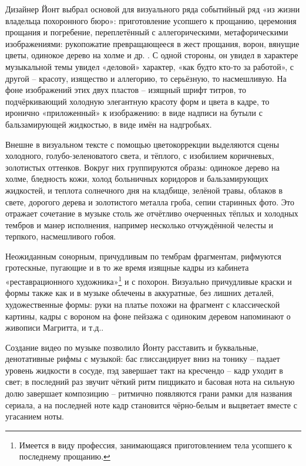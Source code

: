 Дизайнер Йонт выбрал основой для визуального ряда событийный ряд «из жизни владельца похоронного бюро»: приготовление усопшего к прощанию, церемония прощания и погребение, переплетённый с аллегорическими, метафорическими изображениями: рукопожатие превращающееся в жест прощания, ворон, вянущие цветы, одинокое дерево на холме и др. \autocite{yount.SFUTitles.2012}.
С одной стороны, он увидел в характере музыкальной темы увидел «деловой» характер, «как будто кто-то за работой», с другой -- красоту, изящество и аллегорию, то серьёзную, то насмешливую.
На фоне изображений этих двух пластов -- изящный шрифт титров, то подчёркивающий холодную элегантную красоту форм и цвета в кадре, то иронично «приложенный» к изображению: в виде надписи на бутыли с бальзамирующей жидкостью, в виде имён на надгробьях.

Внешне в визуальном тексте с помощью цветокоррекции выделяются сцены холодного, голубо-зеленоватого света, и тёплого, с изобилием коричневых, золотистых оттенков.
Вокруг них группируются образы: одинокое дерево на холме, бледность кожи, холод больничных коридоров и бальзамирующих жидкостей, и теплота солнечного дня на кладбище, зелёной травы, облаков в свете, дорогого дерева и золотистого металла гроба, сепии старинных фото.
Это отражает сочетание в музыке столь же отчётливо очерченных тёплых и холодных тембров и манер исполнения, например несколько отчуждённой челесты и терпкого, насмешливого гобоя.

Неожиданным сонорным, причудливым по тембрам фрагментам, рифмуются гротескные, пугающие и в то же время изящные кадры из кабинета «реставрационного художника»\footnote{Имеется в виду профессия, занимающаяся приготовлением тела усопшего к последнему прощанию.} и с похорон.
Визуально причудливые краски и формы также как и в музыке облечены в аккуратные, без лишних деталей, художественные формы: руки на платье похожи на фрагмент с классической картины, кадры с вороном на фоне пейзажа с одиноким деревом напоминают о живописи Магритта, и т.д..

Создание видео по музыке позволило Йонту расставить и буквальные, денотативные рифмы с музыкой: бас глиссандирует вниз на тонику -- падает уровень жидкости в сосуде, пэд завершает такт на кресчендо -- кадр уходит в свет; в последний раз звучит чёткий ритм пиццикато и басовая нота на сильную долю завершает композицию -- ритмично появляются грани рамки для названия сериала, а на последней ноте кадр становится чёрно-белым и выцветает вместе с угасанием ноты.

